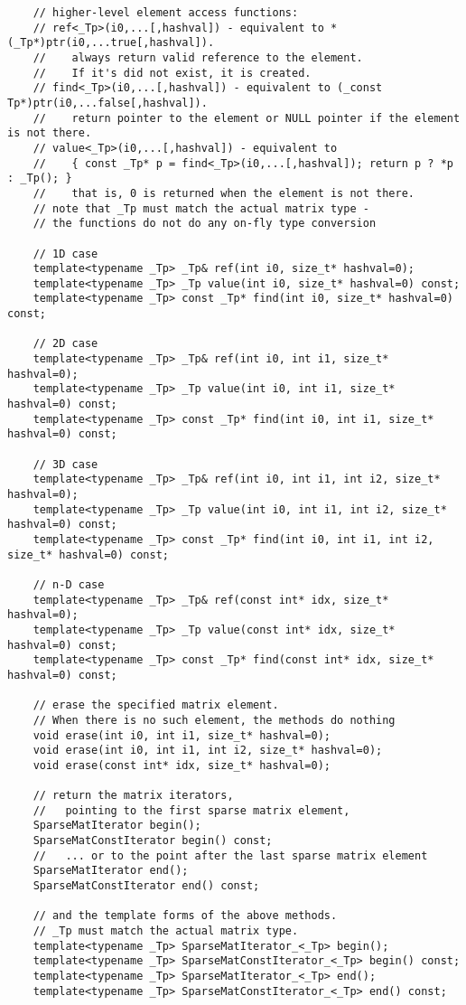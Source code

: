 \begin{lstlisting}
    // higher-level element access functions:
    // ref<_Tp>(i0,...[,hashval]) - equivalent to *(_Tp*)ptr(i0,...true[,hashval]).
    //    always return valid reference to the element.
    //    If it's did not exist, it is created.
    // find<_Tp>(i0,...[,hashval]) - equivalent to (_const Tp*)ptr(i0,...false[,hashval]).
    //    return pointer to the element or NULL pointer if the element is not there.
    // value<_Tp>(i0,...[,hashval]) - equivalent to
    //    { const _Tp* p = find<_Tp>(i0,...[,hashval]); return p ? *p : _Tp(); }
    //    that is, 0 is returned when the element is not there.
    // note that _Tp must match the actual matrix type -
    // the functions do not do any on-fly type conversion
    
    // 1D case
    template<typename _Tp> _Tp& ref(int i0, size_t* hashval=0);   
    template<typename _Tp> _Tp value(int i0, size_t* hashval=0) const;
    template<typename _Tp> const _Tp* find(int i0, size_t* hashval=0) const;

    // 2D case
    template<typename _Tp> _Tp& ref(int i0, int i1, size_t* hashval=0);   
    template<typename _Tp> _Tp value(int i0, int i1, size_t* hashval=0) const;
    template<typename _Tp> const _Tp* find(int i0, int i1, size_t* hashval=0) const;
    
    // 3D case
    template<typename _Tp> _Tp& ref(int i0, int i1, int i2, size_t* hashval=0);
    template<typename _Tp> _Tp value(int i0, int i1, int i2, size_t* hashval=0) const;
    template<typename _Tp> const _Tp* find(int i0, int i1, int i2, size_t* hashval=0) const;

    // n-D case
    template<typename _Tp> _Tp& ref(const int* idx, size_t* hashval=0);
    template<typename _Tp> _Tp value(const int* idx, size_t* hashval=0) const;
    template<typename _Tp> const _Tp* find(const int* idx, size_t* hashval=0) const;

    // erase the specified matrix element.
    // When there is no such element, the methods do nothing
    void erase(int i0, int i1, size_t* hashval=0);
    void erase(int i0, int i1, int i2, size_t* hashval=0);
    void erase(const int* idx, size_t* hashval=0);

    // return the matrix iterators,
    //   pointing to the first sparse matrix element,
    SparseMatIterator begin();
    SparseMatConstIterator begin() const;
    //   ... or to the point after the last sparse matrix element
    SparseMatIterator end();
    SparseMatConstIterator end() const;
    
    // and the template forms of the above methods.
    // _Tp must match the actual matrix type.
    template<typename _Tp> SparseMatIterator_<_Tp> begin();
    template<typename _Tp> SparseMatConstIterator_<_Tp> begin() const;
    template<typename _Tp> SparseMatIterator_<_Tp> end();
    template<typename _Tp> SparseMatConstIterator_<_Tp> end() const;


\end{lstlisting}
